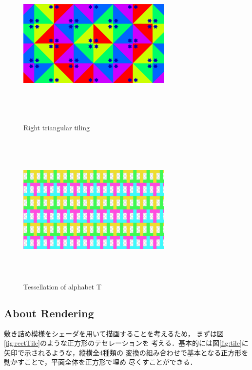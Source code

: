 \begin{figure}[h!tbp]
 \begin{minipage}{0.49\hsize}
  \center
  \includegraphics[width=3in, height=3in, keepaspectratio]{../img/tessellation/rightTriangular.pdf}
  \caption{Right triangular tiling}
  \label{fig:rightTriangular}
 \end{minipage}
 \begin{minipage}{0.49\hsize}
  \center
  \includegraphics[width=3in, height=3in, keepaspectratio]{../img/tessellation/tessellationT.pdf}
  \caption{Tessellation of alphabet T}
  \label{fig:tessellationT}
 \end{minipage}
\end{figure}

\subsection{About Rendering}

敷き詰め模様をシェーダを用いて描画することを考えるため，
まずは図\ref{fig:rectTile}のような正方形のテセレーションを
考える．基本的には図\ref{fig:tile}に矢印で示されるような，縦横全4種類の
変換の組み合わせで基本となる正方形を動かすことで，平面全体を正方形で埋め
尽くすことができる．

